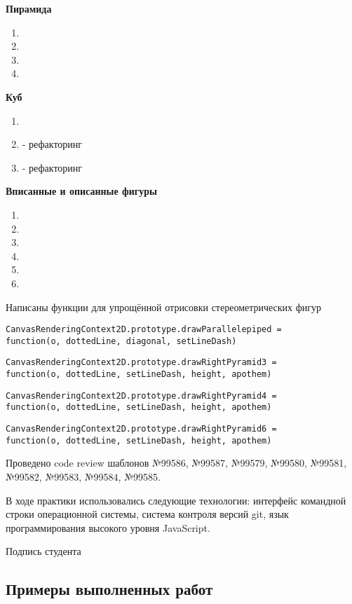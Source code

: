 \textbf{Пирамида}

\begin{enumerate}
	\item {}
	\item {}
	\item {}
	\item {}
\end{enumerate}

\textbf{Куб}

\begin{enumerate}
	\item {}
	\item {} - рефакторинг
	\item {} - рефакторинг
\end{enumerate}

\textbf{Вписанные и описанные фигуры}

\begin{enumerate}
	\item {}
	\item {}
	\item {}
	\item {}
	\item {}
	\item {}
\end{enumerate}

Написаны функции для упрощённой отрисовки стереометрических фигур

\texttt{CanvasRenderingContext2D.prototype.drawParallelepiped = \\ function(o, dottedLine, diagonal, setLineDash)}

\texttt{CanvasRenderingContext2D.prototype.drawRightPyramid3 = \\ function(o, dottedLine, setLineDash, height, apothem)}

\texttt{CanvasRenderingContext2D.prototype.drawRightPyramid4 = \\ function(o, dottedLine, setLineDash, height, apothem)}

\texttt{CanvasRenderingContext2D.prototype.drawRightPyramid6 = \\ function(o, dottedLine, setLineDash, height, apothem)}



Проведено code review шаблонов 
№99586, 
№99587, 
№99579, 
№99580, 
№99581, 
№99582, 
№99583, 
№99584, 
№99585. 

В ходе практики использовались следующие технологии:
интерфейс командной строки операционной системы, система контроля версий
git, язык программирования высокого уровня JavaScript.

\begin{flushright}
	Подпись студента \underline{\hspace{3cm}}
\end{flushright}

\subsection*{Примеры выполненных работ}